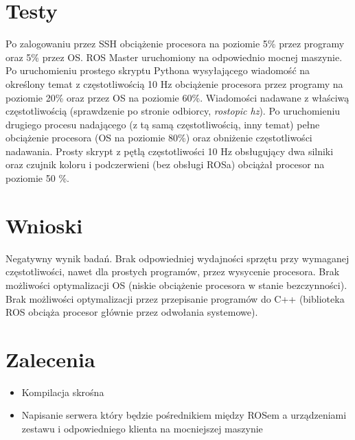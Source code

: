 \documentclass{article}
\begin{document}
\section{Testy}
Po zalogowaniu przez SSH obciążenie procesora na poziomie 5\% przez programy oraz 5\% przez OS. ROS Master uruchomiony na odpowiednio mocnej maszynie. Po uruchomieniu prostego skryptu Pythona wysyłającego wiadomość na określony temat z częstotliwością 10 Hz obciążenie procesora przez programy na poziomie 20\% oraz przez OS na poziomie 60\%. Wiadomości nadawane z właściwą częstotliwością (sprawdzenie po stronie odbiorcy, \textit{rostopic hz}). Po uruchomieniu drugiego procesu nadającego (z tą samą częstotliwością, inny temat) pełne obciążenie procesora (OS na poziomie 80\%) oraz obniżenie częstotliwości nadawania. Prosty skrypt z pętlą częstotliwości 10 Hz obsługujący dwa silniki oraz czujnik koloru i podczerwieni (bez obsługi ROSa) obciążał procesor na poziomie 50 \%.

\section{Wnioski}
Negatywny wynik badań. Brak odpowiedniej wydajności sprzętu przy wymaganej częstotliwości, nawet dla prostych programów, przez wysycenie procesora. Brak możliwości optymalizacji OS (niskie obciążenie procesora w stanie bezczynności). Brak możliwości optymalizacji przez przepisanie programów do C++ (biblioteka ROS obciąża procesor głównie przez odwołania systemowe).

\section{Zalecenia}
\begin{itemize}
	\item Kompilacja skrośna
	\item Napisanie serwera który będzie pośrednikiem między ROSem a urządzeniami zestawu i odpowiedniego klienta na mocniejszej maszynie
\end{itemize}



\end{document}
